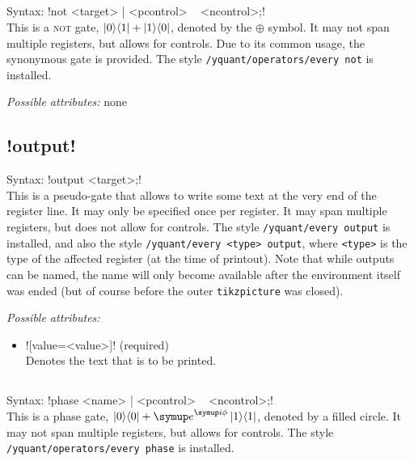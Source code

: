 \documentclass{scrartcl}
\def\ttlink{\link\texttt}
\def\texlink{\link\tex}
\def\yquantlink{\link\yquant}
\def\ii{{\symup i}}
\def\ee{{\symup e}}
\def\ketbra#1#2{\ket{#1}\!\bra{#2}}
\begin{document}
      \subsection{\texorpdfstring{}{not}}
         Syntax: \yquant!not <target> | <pcontrol> ~ <ncontrol>;! \\
         This is a \textsc{not} gate, $\ketbra01 + \ketbra10$, denoted by the $\oplus$ symbol.
         It may not span multiple registers, but allows for controls.
         Due to its common usage, the synonymous gate \yquantlink{cnot} is provided.
         The style \ttlink{/yquant/operators/every not} is installed.

         \emph{Possible attributes:} none

      \subsection[\texorpdfstring{\yquant{output}}{output}]{\yquant!output!}
         Syntax: \yquant!output <target>;! \\
         This is a pseudo\hyp gate that allows to write some text at the very end of the register line.
         It may only be specified once per register.
         It may span multiple registers, but does not allow for controls.
         The style \ttlink{/yquant/every output} is installed, and also the style \texttt{/yquant/every <type> output}, where \texttt{<type>} is the type of the affected register (at the time of printout).
         Note that while outputs can be named, the name will only become available after the \texlink{yquant} environment itself was ended (but of course before the outer \texttt{tikzpicture} was closed).

         \emph{Possible attributes:}
         \begin{itemize}
            \item \yquant![value=<value>]! (required) \\
               Denotes the text that is to be printed.
         \end{itemize}

      \subsection{\texorpdfstring{}{phase}}
         Syntax: \yquant!phase <name> | <pcontrol> ~ <ncontrol>;! \\
         This is a phase gate, $\ketbra00 + \ee^{\ii\phi} \ketbra11$, denoted by a filled circle.
         It may not span multiple registers, but allows for controls.
         The style \ttlink{/yquant/operators/every phase} is installed.
\end{document}
